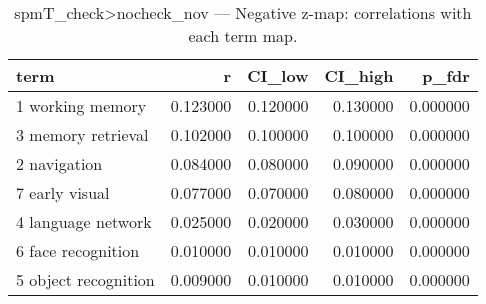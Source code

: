 \begin{table}
\caption{spmT_check>nocheck_nov — Negative z-map: correlations with each term map.}
\label{tab:spmT_check>nocheck_nov_neg}
\begin{tabular}{lrrrr}
\toprule
term & r & CI\_low & CI\_high & p\_fdr \\
\midrule
1 working memory & 0.123000 & 0.120000 & 0.130000 & 0.000000 \\
3 memory retrieval & 0.102000 & 0.100000 & 0.100000 & 0.000000 \\
2 navigation & 0.084000 & 0.080000 & 0.090000 & 0.000000 \\
7 early visual & 0.077000 & 0.070000 & 0.080000 & 0.000000 \\
4 language network & 0.025000 & 0.020000 & 0.030000 & 0.000000 \\
6 face recognition & 0.010000 & 0.010000 & 0.010000 & 0.000000 \\
5 object recognition & 0.009000 & 0.010000 & 0.010000 & 0.000000 \\
\bottomrule
\end{tabular}
\end{table}

